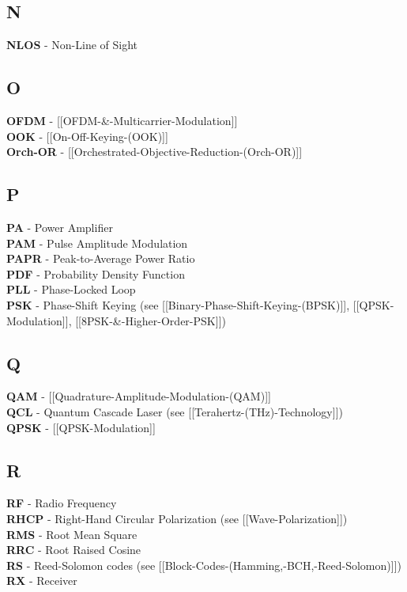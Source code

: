 \subsection{N}\label{n}

\textbf{NLOS} - Non-Line of Sight

\subsection{O}\label{o}

\textbf{OFDM} - {[}{[}OFDM-\&-Multicarrier-Modulation{]}{]}\\
\textbf{OOK} - {[}{[}On-Off-Keying-(OOK){]}{]}\\
\textbf{Orch-OR} -
{[}{[}Orchestrated-Objective-Reduction-(Orch-OR){]}{]}

\subsection{P}\label{p}

\textbf{PA} - Power Amplifier\\
\textbf{PAM} - Pulse Amplitude Modulation\\
\textbf{PAPR} - Peak-to-Average Power Ratio\\
\textbf{PDF} - Probability Density Function\\
\textbf{PLL} - Phase-Locked Loop\\
\textbf{PSK} - Phase-Shift Keying (see
{[}{[}Binary-Phase-Shift-Keying-(BPSK){]}{]},
{[}{[}QPSK-Modulation{]}{]}, {[}{[}8PSK-\&-Higher-Order-PSK{]}{]})

\subsection{Q}\label{q}

\textbf{QAM} - {[}{[}Quadrature-Amplitude-Modulation-(QAM){]}{]}\\
\textbf{QCL} - Quantum Cascade Laser (see
{[}{[}Terahertz-(THz)-Technology{]}{]})\\
\textbf{QPSK} - {[}{[}QPSK-Modulation{]}{]}

\subsection{R}\label{r}

\textbf{RF} - Radio Frequency\\
\textbf{RHCP} - Right-Hand Circular Polarization (see
{[}{[}Wave-Polarization{]}{]})\\
\textbf{RMS} - Root Mean Square\\
\textbf{RRC} - Root Raised Cosine\\
\textbf{RS} - Reed-Solomon codes (see
{[}{[}Block-Codes-(Hamming,-BCH,-Reed-Solomon){]}{]})\\
\textbf{RX} - Receiver

